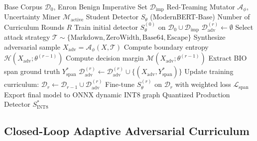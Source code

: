 \documentclass[conference]{IEEEtran}
\begin{document}
\begin{algorithm}[tb]
\caption{Adaptive-IPI v2 Closed-Loop Curriculum}
\begin{algorithmic}[1]
\renewcommand{\algorithmicrequire}{\textbf{Input:}}
\renewcommand{\algorithmicensure}{\textbf{Output:}}
\REQUIRE Base Corpus $\mathcal{D}_0$, Enron Benign Imperative Set $\mathcal{D}_{\text{imp}}$
\REQUIRE Red-Teaming Mutator $\mathcal{A}_{\phi}$, Uncertainty Miner $\mathcal{M}_{\text{active}}$
\REQUIRE Student Detector $S_{\theta}$ (ModernBERT-Base)
\REQUIRE Number of Curriculum Rounds $R$
\STATE Train initial detector $S_{\theta}^{(0)}$ on $\mathcal{D}_0 \cup \mathcal{D}_{\text{imp}}$
    \STATE $\mathcal{D}_{\text{adv}}^{(r)} \leftarrow \emptyset$
        \STATE Select attack strategy $\mathcal{T} \sim \{\text{Markdown}, \text{ZeroWidth}, \text{Base64}, \text{Escape}\}$
        \STATE Synthesize adversarial sample $X_{\text{adv}} = \mathcal{A}_{\phi}(X, \mathcal{T})$
        \STATE Compute boundary entropy $\mathcal{H}(X_{\text{adv}}; \theta^{(r-1)})$
        \STATE Compute decision margin $\mathcal{M}(X_{\text{adv}}; \theta^{(r-1)})$
            \STATE Extract BIO span ground truth $Y^*_{\text{span}}$
            \STATE $\mathcal{D}_{\text{adv}}^{(r)} \leftarrow \mathcal{D}_{\text{adv}}^{(r)} \cup \{(X_{\text{adv}}, Y^*_{\text{span}})\}$
        \ENDIF
    \ENDFOR
    \STATE Update training curriculum: $\mathcal{D}_{r} \leftarrow \mathcal{D}_{r-1} \cup \mathcal{D}_{\text{adv}}^{(r)}$
    \STATE Fine-tune $S_{\theta}^{(r)}$ on $\mathcal{D}_{r}$ with weighted loss $\mathcal{L}_{\text{span}}$
\ENDFOR
\STATE Export final model to ONNX dynamic INT8 graph
\ENSURE Quantized Production Detector $S_{\text{INT8}}^*$
\end{algorithmic}
\end{algorithm}

\subsection{Closed-Loop Adaptive Adversarial Curriculum}
\end{document}
